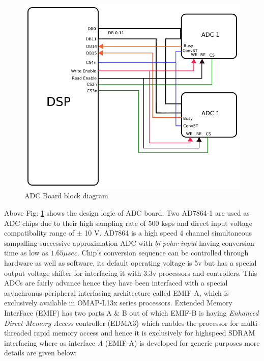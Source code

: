 \begin{figure}[ht]
\includegraphics[width=\columnwidth]{fig/ADC_board.png}
\caption{ADC Board block diagram}
\label{fig:adc_board}
\end{figure}
Above Fig: \ref{fig:adc_board} shows the design logic of ADC board. Two AD7864-1 are used as ADC chips due to their high sampling rate of 500 ksps and direct input voltage compatibality range of $\pm$ 10 V. AD7864 is a high speed 4 channel simultaneous sampalling successive approximation ADC with \textit{bi-polar input} having conversion time as low as $1.65 \mu sec$. Chip's conversion sequence can be controlled through hardware as well as software, its default operating voltage is 5v but has a special output voltage shifter for interfacing it with 3.3v processors and controllers. This ADCs are fairly advance hence they have been interfaced with a special asynchronus peripheral interfacing architecture called EMIF-A, which is exclusively available in OMAP-L13x series processors. Extended Memory InterFace (EMIF) has two parts A \& B out of which EMIF-B is having \textit{Enhanced Direct Memory Access} controller (EDMA3) which enables the processor for multi-threaded rapid memory access and hence it is exclusively for highspeed SDRAM interfacing where as interface \textit{A} (EMIF-A) is developed for generic purposes more details are given below:

